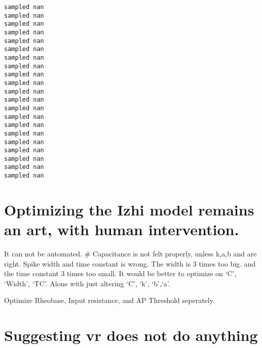 \documentclass[11pt]{article}
\begin{document}
    \begin{Verbatim}[commandchars=\\\{\}]
sampled nan
sampled nan
sampled nan
sampled nan
sampled nan
sampled nan
sampled nan
sampled nan
sampled nan
sampled nan
sampled nan
sampled nan
sampled nan
sampled nan
sampled nan
sampled nan
sampled nan
sampled nan
sampled nan
sampled nan
sampled nan
    \end{Verbatim}

    \hypertarget{optimizing-the-izhi-model-remains-an-art-with-human-intervention.}{%
\section{Optimizing the Izhi model remains an art, with human
intervention.}\label{optimizing-the-izhi-model-remains-an-art-with-human-intervention.}}

It can not be automated. \# Capacitance is not felt properly, unless
k,a,b and are right. Spike width and time constant is wrong. The width
is 3 times too big. and the time constant 3 times too small. It would be
better to optimize on `C', `Width', `TC'. Alone with just altering `C',
`k', `b',`a'.

Optimize Rheobase, Input resistance, and AP Threshold seperately.

    \hypertarget{suggesting-vr-does-not-do-anything}{%
\section{Suggesting vr does not do
anything}\label{suggesting-vr-does-not-do-anything}}


    
    
    
\end{document}
